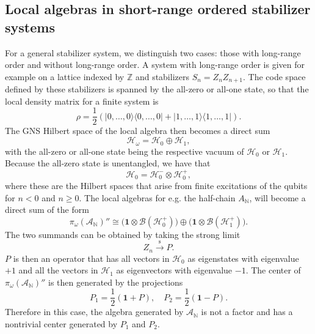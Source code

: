 \documentclass[aps,pra,reprint,superscriptaddress]{revtex4-2}
\newcommand{\cA}{{\mathcal A}}
\newcommand{\cB}{{\mathcal B}}
\newcommand{\cH}{{\mathcal H}}
\renewcommand\r{\rho}
\newcommand\w{\omega}
\newcommand{\id}{\mathbf 1}
\providecommand{\ket}[1]{\lvert #1\rangle}
\providecommand{\bra}[1]{\langle #1\rvert}
\theoremstyle{definition}
\theoremstyle{remark}
\begin{document}
\subsection{Local algebras in short-range ordered stabilizer systems}
    
For a general stabilizer system, we distinguish two cases: those with long-range
order and without long-range order. A system with long-range order is given for
example on a lattice indexed by $\mathbb{Z}$ and stabilizers $S_n = Z_n
Z_{n+1}$. The code space defined by these stabilizers is spanned by the all-zero
or all-one state, so that the local density matrix for a finite system is 
\begin{equation}
    \r = \frac{1}{2} (\ket{0, \hdots,0}\bra{0,\hdots,0} + \ket{1, \hdots,
    1}\bra{ 1, \hdots, 1}).
\end{equation}
The GNS Hilbert space of the local algebra then becomes a direct sum
\begin{equation}
    \cH_\w = \cH_0 \oplus \cH_1,
\end{equation}
with the all-zero or all-one state being the respective vacuum of $\cH_0$ or $\cH_1$.
Because the all-zero state is unentangled, we have that 
\begin{equation}
    \cH_0 = \cH^-_{0} \otimes \cH^+_{0},
\end{equation}
where these are the Hilbert spaces that arise from finite excitations of the
qubits for $n<0$ and $n \geq 0$.
The local algebras for e.g. the half-chain $A_{\mathbb{N}}$, will become 
a direct sum of the form
\begin{equation}
    \pi_\w(\cA_{\mathbb{N}})'' \cong \big( \id \otimes \cB(\cH^+_0) \big) \oplus
    \big( \id \otimes \cB(\cH^+_1) \big).
\end{equation}
The two summands can be obtained by taking the strong limit
\begin{equation}
    Z_n \xrightarrow{\mathrm{s}} P.
\end{equation}
$P$ is then an operator that has all vectors in $\cH_0$
as eigenstates with eigenvalue $+1$ and all the vectors in $\cH_1$ as eigenvectors
with eigenvalue $-1$. The center of $\pi_\w(\cA_{\mathbb{N}})''$ is then generated by the
projections
\begin{equation}
    P_1 = \frac{1}{2}(\id + P),\quad P_2 = \frac{1}{2} (\id - P).
\end{equation}
Therefore in this case, the algebra generated by $\cA_{\mathbb{N}}$ is not a factor and has a nontrivial
center generated by $P_1$ and $P_2$.
\end{document}

